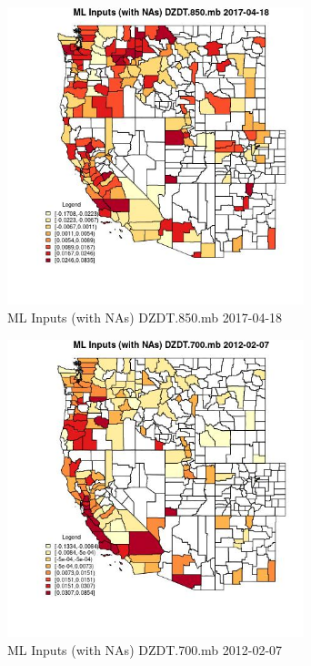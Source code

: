 \begin{figure} 
\centering  
\includegraphics[width=0.77\textwidth]{Code_Outputs/Report_ML_input_PM25_Step4_part_f_de_duplicated_aves_prioritize_24hr_obswNAs_CountyDZDT850mbMean2017-04-18.jpg} 
\caption{\label{fig:Report_ML_input_PM25_Step4_part_f_de_duplicated_aves_prioritize_24hr_obswNAsCountyDZDT850mbMean2017-04-18}ML Inputs (with NAs) DZDT.850.mb 2017-04-18} 
\end{figure} 
 

\begin{figure} 
\centering  
\includegraphics[width=0.77\textwidth]{Code_Outputs/Report_ML_input_PM25_Step4_part_f_de_duplicated_aves_prioritize_24hr_obswNAs_CountyDZDT700mbMean2012-02-07.jpg} 
\caption{\label{fig:Report_ML_input_PM25_Step4_part_f_de_duplicated_aves_prioritize_24hr_obswNAsCountyDZDT700mbMean2012-02-07}ML Inputs (with NAs) DZDT.700.mb 2012-02-07} 
\end{figure} 
 

